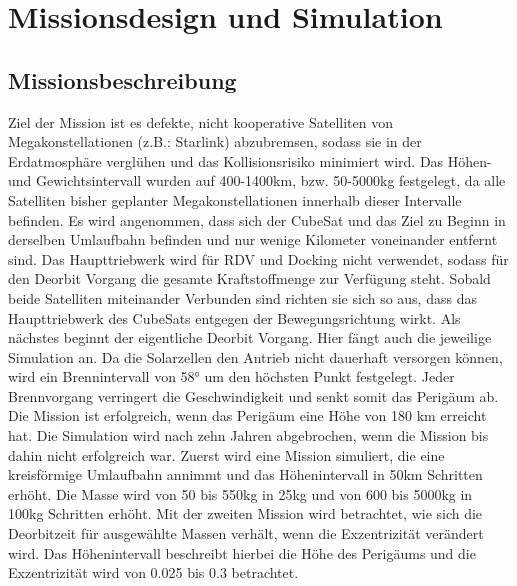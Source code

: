 \chapter{Missionsdesign und Simulation}


\section{Missionsbeschreibung}

Ziel der Mission ist es defekte, nicht kooperative Satelliten von Megakonstellationen (z.B.: Starlink) abzubremsen, sodass sie in der Erdatmosphäre verglühen und das Kollisionsrisiko minimiert wird. Das Höhen- und Gewichtsintervall wurden auf 400-1400km, bzw. 50-5000kg festgelegt, da alle Satelliten bisher geplanter Megakonstellationen innerhalb dieser Intervalle befinden.
Es wird angenommen, dass sich der CubeSat und das Ziel zu Beginn in derselben Umlaufbahn befinden und nur wenige Kilometer voneinander entfernt sind. Das Haupttriebwerk wird für RDV und Docking nicht verwendet, sodass für den Deorbit Vorgang die gesamte Kraftstoffmenge zur Verfügung steht. Sobald beide Satelliten miteinander Verbunden sind richten sie sich so aus, dass das Haupttriebwerk des CubeSats entgegen der Bewegungsrichtung wirkt. Als nächstes beginnt der eigentliche Deorbit Vorgang. Hier fängt auch die jeweilige Simulation an. Da die Solarzellen den Antrieb nicht dauerhaft versorgen können, wird ein Brennintervall von 58° um den höchsten Punkt festgelegt. Jeder Brennvorgang verringert die Geschwindigkeit und senkt somit das Perigäum ab. Die Mission ist erfolgreich, wenn das Perigäum eine Höhe von 180 km erreicht hat. Die Simulation wird nach zehn Jahren abgebrochen, wenn die Mission bis dahin nicht erfolgreich war. 
Zuerst wird eine Mission simuliert, die eine kreisförmige Umlaufbahn annimmt und das Höhenintervall in 50km Schritten erhöht. Die Masse wird von 50 bis 550kg in 25kg und von 600 bis 5000kg in 100kg Schritten erhöht.
Mit der zweiten Mission wird betrachtet, wie sich die Deorbitzeit für ausgewählte Massen verhält, wenn die Exzentrizität verändert wird. Das Höhenintervall beschreibt hierbei die Höhe des Perigäums und die Exzentrizität wird von 0.025 bis 0.3 betrachtet.



